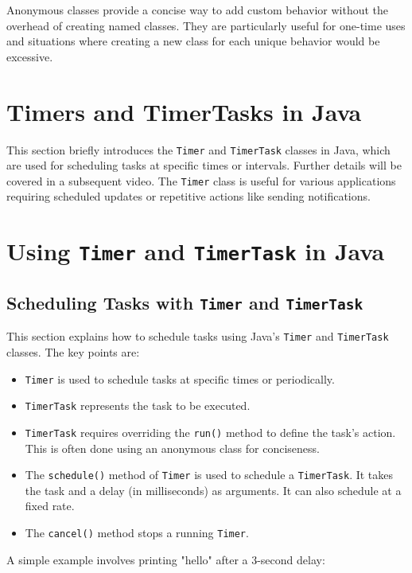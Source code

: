 \documentclass{article}
\begin{document}
\begin{itemize}
Anonymous classes provide a concise way to add custom behavior without the overhead of creating named classes.  They are particularly useful for one-time uses and situations where creating a new class for each unique behavior would be excessive.

\section{Timers and TimerTasks in Java}

This section briefly introduces the \texttt{Timer} and \texttt{TimerTask} classes in Java, which are used for scheduling tasks at specific times or intervals.  Further details will be covered in a subsequent video.  The \texttt{Timer} class is useful for various applications requiring scheduled updates or repetitive actions like sending notifications.


\section{Using \texttt{Timer} and \texttt{TimerTask} in Java}

\subsection{Scheduling Tasks with \texttt{Timer} and \texttt{TimerTask}}

This section explains how to schedule tasks using Java's \texttt{Timer} and \texttt{TimerTask} classes.  The key points are:

\begin{itemize}
    \item \texttt{Timer} is used to schedule tasks at specific times or periodically.
    \item \texttt{TimerTask} represents the task to be executed.
    \item  \texttt{TimerTask} requires overriding the \texttt{run()} method to define the task's action.  This is often done using an anonymous class for conciseness.
    \item The \texttt{schedule()} method of \texttt{Timer} is used to schedule a \texttt{TimerTask}. It takes the task and a delay (in milliseconds) as arguments.  It can also schedule at a fixed rate.
    \item The \texttt{cancel()} method stops a running \texttt{Timer}.
\end{itemize}

A simple example involves printing "hello" after a 3-second delay:


\end{itemize}
\end{document}
